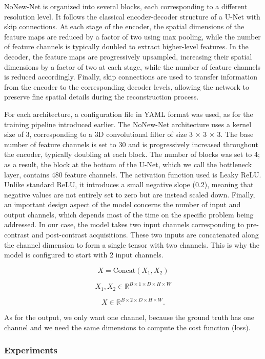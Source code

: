 \documentclass[12pt]{article}
\begin{document}
NoNew-Net is organized into several blocks, each corresponding to a different resolution level.
It follows the classical encoder-decoder structure of a U-Net with skip connections.
At each stage of the encoder, the spatial dimensions of the feature maps are reduced by a factor of two using max pooling, while the number of feature channels is typically doubled to extract higher-level features.
In the decoder, the feature maps are progressively upsampled, increasing their spatial dimensions by a factor of two at each stage, while the number of feature channels is reduced accordingly.
Finally, skip connections are used to transfer information from the encoder to the corresponding decoder levels, allowing the network to preserve fine spatial details during the reconstruction process.
\vspace{0.5cm}

For each architecture, a configuration file in YAML format was used, as for the training pipeline introduced earlier.
The NoNew-Net architecture uses a kernel size of 3, corresponding to a 3D convolutional filter of size 3 × 3 × 3.
The base number of feature channels is set to 30 and is progressively increased throughout the encoder, typically doubling at each block.
The number of blocks was set to 4; as a result, the block at the bottom of the U-Net, which we call the bottleneck layer, contains 480 feature channels.
The activation function used is Leaky ReLU. Unlike standard ReLU, it introduces a small negative slope (0.2), meaning that negative values are not entirely set to zero but are instead scaled down.
Finally, an important design aspect of the model concerns the number of input and output channels, which depends most of the time on the specific problem being addressed.
In our case, the model takes two input channels corresponding to pre-contrast and post-contrast acquisitions.
These two inputs are concatenated along the channel dimension to form a single tensor with two channels.
This is why the model is configured to start with 2 input channels.


\[
X = \mathrm{Concat}(X_1, X_2)
\]


\[
X_1, X_2 \in \mathbb{R}^{B \times 1 \times D \times H \times W}
\]


\[
X \in \mathbb{R}^{B \times 2 \times D \times H \times W}.
\]


As for the output, we only want one channel, because the ground truth has one channel and we need the same dimensions to compute the cost function (loss).

\subsubsection{Experiments}
\end{document}
